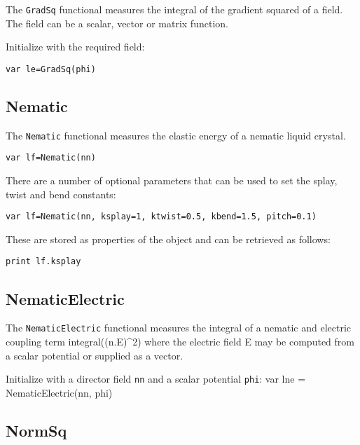 The \texttt{GradSq} functional measures the integral of the gradient
squared of a field. The field can be a scalar, vector or matrix
function.

Initialize with the required field:

\begin{lstlisting}
var le=GradSq(phi)
\end{lstlisting}

\hypertarget{nematic}{%
\subsection{Nematic}\label{nematic}}

The \texttt{Nematic} functional measures the elastic energy of a nematic
liquid crystal.

\begin{lstlisting}
var lf=Nematic(nn)
\end{lstlisting}

There are a number of optional parameters that can be used to set the
splay, twist and bend constants:

\begin{lstlisting}
var lf=Nematic(nn, ksplay=1, ktwist=0.5, kbend=1.5, pitch=0.1)
\end{lstlisting}

These are stored as properties of the object and can be retrieved as
follows:

\begin{lstlisting}
print lf.ksplay
\end{lstlisting}

\hypertarget{nematicelectric}{%
\subsection{NematicElectric}\label{nematicelectric}}

The \texttt{NematicElectric} functional measures the integral of a
nematic and electric coupling term integral((n.E)\^{}2) where the
electric field E may be computed from a scalar potential or supplied as
a vector.

Initialize with a director field \texttt{nn} and a scalar potential
\texttt{phi}: var lne = NematicElectric(nn, phi)

\hypertarget{normsq}{%
\subsection{NormSq}\label{normsq}}

